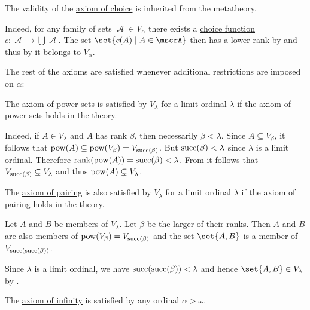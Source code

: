 \begin{remark}
\begin{thmenum}[series=thm:cumulative_hierarchy_model_of_zfc]
     The validity of the \hyperref[def:zfc/choice]{axiom of choice} is inherited from the metatheory.

    Indeed, for any family of sets \( \mscrA \in V_\alpha \) there exists a \hyperref[def:choice_function]{choice function} \( c: \mscrA \to \bigcup \mscrA \). The set \( \set{ c(A) \given A \in \mscrA } \) then has a lower rank by  and thus by  it belongs to \( V_\alpha \).
  \end{thmenum}

  The rest of the axioms are satisfied whenever additional restrictions are imposed on \( \alpha \):
  \begin{thmenum}[series=thm:cumulative_hierarchy_model_of_zfc]
     The \hyperref[def:zfc/power_set]{axiom of power sets} is satisfied by \( V_\lambda \) for a limit ordinal \( \lambda \) if the axiom of power sets holds in the theory.

    Indeed, if \( A \in V_\lambda \) and \( A \) has rank \( \beta \), then necessarily \( \beta < \lambda \). Since \( A \subseteq V_\beta \), it follows that \( \operatorname{pow}(A) \subseteq \operatorname{pow}(V_\beta) = V_{\operatorname{succ}(\beta)} \). But \( \operatorname{succ}(\beta) < \lambda \) since \( \lambda \) is a limit ordinal. Therefore \( \operatorname{rank}(\operatorname{pow}(A)) = \operatorname{succ}(\beta) < \lambda \). From  it follows that \( V_{\operatorname{succ}(\beta)} \subsetneq V_\lambda \) and thus \( \operatorname{pow}(A) \subsetneq V_\lambda \).

     The \hyperref[def:zfc/pairing]{axiom of pairing} is also satisfied by \( V_\lambda \) for a limit ordinal \( \lambda \) if the axiom of pairing holds in the theory.

    Let \( A \) and \( B \) be members of \( V_\lambda \). Let \( \beta \) be the larger of their ranks. Then \( A \) and \( B \) are also members of \( \operatorname{pow}(V_\beta) = V_{\operatorname{succ}(\beta)} \) and the set \( \set{ A, B } \) is a member of \( V_{\operatorname{succ}(\operatorname{succ}(\beta))} \).

    Since \( \lambda \) is a limit ordinal, we have \( \operatorname{succ}(\operatorname{succ}(\beta)) < \lambda \) and hence \( \set{ A, B } \in V_\lambda \) by .

     The \hyperref[def:zfc/infinity]{axiom of infinity} is satisfied by any ordinal \( \alpha > \omega \).


\end{thmenum}
\end{remark}
